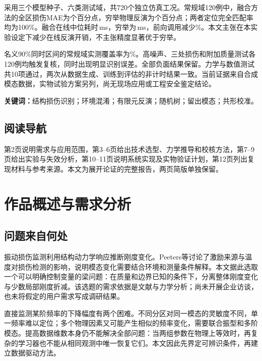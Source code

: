 \documentclass[UTF8,a4paper,11pt,fontset=fandol]{ctexart}
\begin{document}
采用三个模型种子、六类测试域，共720个独立仿真工况。常规域120例中，融合方法的全区损伤MAE为\HybridMAE 个百分点，穷举物理反演为\PhysicsMAE 个百分点；两者定位完全匹配率均为100\%。融合在线中位耗时\HybridTime\,ms，穷举为\PhysicsTime\,ms，前向调用减少\CallSaving\%。本文主张在本实验设定下减少在线反演开销，不主张精度显著优于穷举。

名义90\%同时区间的常规域实测覆盖率为\Coverage\%。高噪声、三处损伤和附加质量测试各120例均触发复核，同时出现明显识别误差。全部负面结果保留。力学与数值测试共10项通过，两次从数据生成、训练到评估的非计时结果一致。当前证据来自合成模态数据，实物试验方案另列，尚无现场应用或工程安全鉴定结论。

\vspace{3mm}\noindent\textbf{关键词：}结构损伤识别；环境混淆；有限元反演；随机树；留出模态；共形校准。
\vspace{4mm}\subsection*{阅读导航}
第2页说明需求与应用范围，第3--6页给出技术选型、力学推导和校核方法，第7--9页给出实验与失效分析，第10--11页说明系统实现及实物验证计划，第12页列出复现材料与参考来源。本文为展开论证的完整报告，两页简版单独保留。

\newpage
\section{作品概述与需求分析}
\subsection{问题来自何处}
振动损伤监测利用结构动力学响应推断刚度变化。Peeters等讨论了激励来源与温度对损伤检测的影响\cite{peeters}，说明模态变化需要结合环境和测量条件解释。本文据此选取一个可以明确控制变量的梁问题：在质量和边界已知的条件下，分离整体刚度变化与少数局部刚度折减。该选题的需求依据是文献与力学分析；尚未开展企业访谈，也未将假定的用户需求写成调研结果。

直接监测某阶频率的下降幅度有两个困难。不同分区对同一模态的灵敏度不同，单一频率难以定位；多个物理因素又可能产生相似的频率变化，需要联合振型和多阶模态。提高数据维数本身仍不能解决全部问题：当两组参数在物理上等效时，再复杂的学习器也不能从相同观测中唯一恢复它们。本文因此先界定可辨识条件，再建立数据驱动方法。
\end{document}
